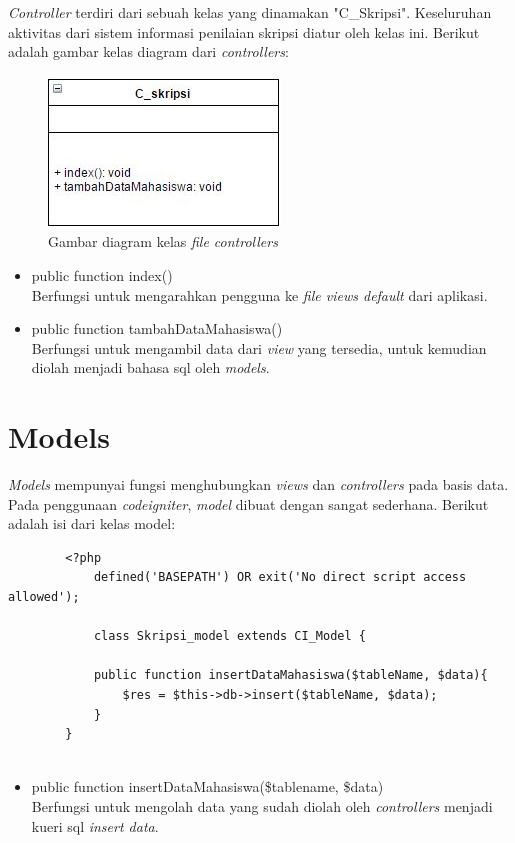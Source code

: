 	\textit{Controller} terdiri dari sebuah kelas yang dinamakan "C\_Skripsi". Keseluruhan aktivitas dari sistem informasi penilaian skripsi diatur oleh kelas ini. Berikut adalah gambar kelas diagram dari \textit{controllers}:
	\begin{figure}[H]
		\centering
		\includegraphics[scale= 1.0]{Gambar/C_skripsi}
		\caption {Gambar diagram kelas \textit{file controllers}}
		\label{fig:controllers}
	\end{figure}
	
	\begin{itemize}
		\item public function index()\\
		Berfungsi untuk mengarahkan pengguna ke \textit{file views default} dari aplikasi.
		\item public function tambahDataMahasiswa()\\
		Berfungsi untuk mengambil data dari \textit{view} yang tersedia, untuk kemudian diolah menjadi bahasa sql oleh \textit{models}.
	\end{itemize}
	
	\section{Models}
	\label{sec: models}
	
	\textit{Models} mempunyai fungsi menghubungkan \textit{views} dan \textit{controllers} pada basis data. Pada penggunaan \textit{codeigniter}, \textit{model} dibuat dengan sangat sederhana. Berikut adalah isi dari kelas model:
	\begin{lstlisting}
		<?php
			defined('BASEPATH') OR exit('No direct script access allowed');
			
			class Skripsi_model extends CI_Model {
			
			public function insertDataMahasiswa($tableName, $data){
				$res = $this->db->insert($tableName, $data);
			}
		}
		
	\end{lstlisting}
	
	\begin{itemize}
		\item public function insertDataMahasiswa(\$tablename, \$data)\\
		Berfungsi untuk mengolah data yang sudah diolah oleh \textit{controllers} menjadi kueri sql \textit{insert data}.
	\end{itemize}
	
